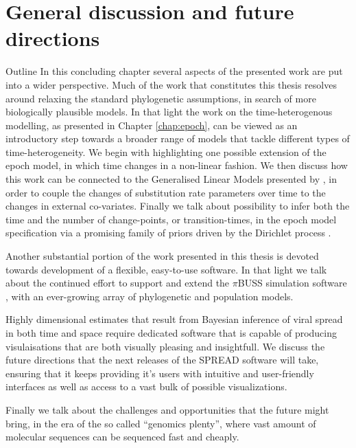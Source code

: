 \chapter{General discussion and future directions}

\begin{remark}{Outline}
In this concluding chapter several aspects of the presented work are put into a wider perspective.
Much of the work that constitutes this thesis resolves around relaxing the standard phylogenetic assumptions, in search of more biologically plausible models. 
In that light the work on the time-heterogenous modelling, as presented in Chapter \ref{chap:epoch}, can be viewed as an introductory step towards a broader range of models that tackle different types of time-heterogeneity.
We begin with highlighting one possible extension of the epoch model, in which time changes in a non-linear fashion.
We then discuss how this work can be connected to the Generalised Linear Models presented by \citet{Lemey2014}, in order to couple the changes of substitution rate parameters over time to the changes in external co-variates.
Finally we talk about possibility to infer both the time and the number of change-points, or transition-times, in the epoch model specification via a promising family of priors driven by the Dirichlet process \citep{Ferguson1973}. 

Another substantial portion of the work presented in this thesis is devoted towards development of a flexible, easy-to-use software.
In that light we talk about the continued effort to support and extend the $\pi$BUSS simulation software \citep{Bielejec2014b}, with an ever-growing array of phylogenetic and population models.

Highly dimensional estimates that result from Bayesian inference of viral spread in both time and space require dedicated software that is capable of producing visulaisations that are both visually pleasing and insightfull.
We discuss the future directions that the next releases of the SPREAD software \citep{Bielejec2011} will take, ensuring that it keeps providing it's users with intuitive and user-friendly interfaces as well as access to a vast bulk of possible visualizations.

Finally we talk about the challenges and opportunities that the future might bring, in the era of the so called ``genomics plenty'', where vast amount of molecular sequences can be sequenced fast and cheaply.
\end{remark}

